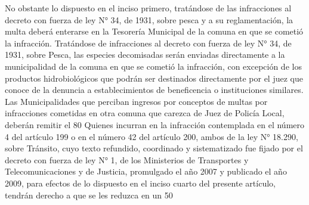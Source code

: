     No obstante lo dispuesto en el inciso primero, tratándose de las infracciones al decreto con fuerza de ley N° 34, de 1931, sobre pesca y a su reglamentación, la multa deberá enterarse en la Tesorería Municipal de la comuna en que se cometió la infracción.
    Tratándose de infracciones al decreto con fuerza de ley N° 34, de 1931, sobre Pesca, las especies decomisadas serán enviadas directamente a la municipalidad de la comuna en que se cometió la infracción, con excepción de los productos hidrobiológicos que podrán ser destinados directamente por el juez que conoce de la denuncia a establecimientos de beneficencia o instituciones similares.
    Las Municipalidades que perciban ingresos por conceptos de multas por infracciones cometidas en otra comuna que carezca de Juez de Policía Local, deberán remitir el 80%
    Quienes incurran en la infracción contemplada en el número 4 del artículo 199 o en el número 42 del artículo 200, ambos de la ley N° 18.290, sobre Tránsito, cuyo texto refundido, coordinado y sistematizado fue fijado por el decreto con fuerza de ley N° 1, de los Ministerios de Transportes y Telecomunicaciones y de Justicia, promulgado el año 2007 y publicado el año 2009, para efectos de lo dispuesto en el inciso cuarto del presente artículo, tendrán derecho a que se les reduzca en un 50%




